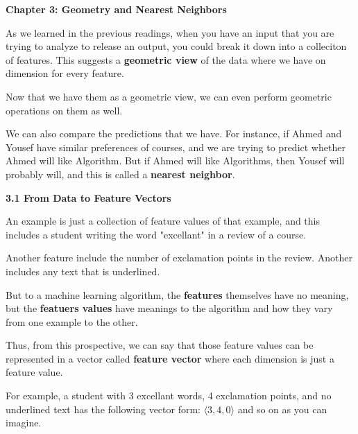 \documentclass{article}
\begin{document}
\begin{center}
    \Huge \textbf{Chapter 3: Geometry and Nearest Neighbors}
    \vspace{0.7cm}
\end{center}

\large As we learned in the previous readings, when you have an input that you are trying to analyze to release an output, you could break it down into a colleciton of features.
This suggests a \textbf{geometric view} of the data where we have on dimension for every feature.

\vspace{0.5cm}

Now that we have them as a geometric view, we can even perform geometric operations on them as well.

\vspace{0.5cm}

We can also compare the predictions that we have. For instance, if Ahmed and Yousef have similar preferences of courses, and we are trying to predict whether Ahmed will like Algorithm.
But if Ahmed will like Algorithms, then Yousef will probably will, and this is called a \textbf{nearest neighbor}.

\vspace{0.5cm}

\LARGE \textbf{3.1 From Data to Feature Vectors}

\vspace{0.7cm}

\large An example is just a collection of feature values of that example, and this includes a student writing the word "excellant" in a review of a course.

Another feature include the number of exclamation points in the review. Another includes any text that is underlined.

But to a machine learning algorithm, the \textbf{features} themselves have no meaning, but  the \textbf{featuers values} have meanings to the algorithm and how they vary from one example to the other.

\vspace{0.5cm}

Thus, from this prospective, we can say that those feature values can be represented in a vector called \textbf{feature vector} where each dimension is just a feature value.

\vspace{0.5cm}

For example, a student with 3 excellant words, 4 exclamation points, and no underlined text has the following vector form: $\langle 3, 4, 0 \rangle $ and so on as you can imagine.
\end{document}
